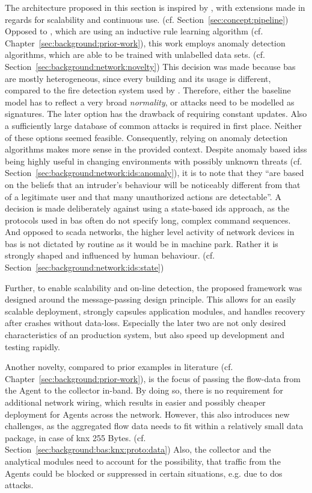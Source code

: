 The architecture proposed in this section is inspired by \textcite{Pan2014}, with extensions made in regards for scalability and continuous use. (cf. Section~\ref{sec:concept:pipeline})
Opposed to \textcite{Pan2014}, which are using an inductive rule learning algorithm (cf. Chapter~\ref{sec:background:prior-work}), this work employs anomaly detection algorithms, which are able to be trained with unlabelled data sets. (cf. Section~\ref{sec:background:network:novelty})
This decision was made because \gls{bas} are mostly heterogeneous, since every building and its usage is different, compared to the fire detection system used by \textcite{Pan2014}.
Therefore, either the baseline model has to reflect a very broad \emph{normality}, or attacks need to be modelled as signatures. The later option has the drawback of requiring constant updates. Also a sufficiently large database of common attacks is required in first place.
Neither of these options seemed feasible.
Consequently, relying on anomaly detection algorithms makes more sense in the provided context.
Despite anomaly based \glspl{ids} being highly useful in changing environments with possibly unknown threats (cf. Section~\ref{sec:background:network:ids:anomaly}), it is to note that they \enquote{are based on the beliefs that an intruder's behaviour will be noticeably different from that of a legitimate user and that many unauthorized actions are detectable}. \parencite{Mukherjee1994,Yang2006}
A decision is made deliberately against using a state-based \gls{ids} approach, as the protocols used in \gls{bas} often do not specify long, complex command sequences. And opposed to \gls{scada} networks, the higher level activity of network devices in \gls{bas} is not dictated by routine as it would be in machine park. Rather it is strongly shaped and influenced by human behaviour. (cf. Section~\ref{sec:background:network:ids:state})

Further, to enable scalability and on-line detection, the proposed framework was designed around the message-passing design principle.
This allows for an easily scalable deployment, strongly capsules application modules, and handles recovery after crashes without data-loss.
Especially the later two are not only desired characteristics of an production system, but also speed up development and testing rapidly.

Another novelty, compared to prior examples in literature (cf. Chapter~\ref{sec:background:prior-work}), is the focus of passing the flow-data from the Agent to the collector in-band. By doing so, there is no requirement for additional network wiring, which results in easier and possibly cheaper deployment for Agents across the network.
However, this also introduces new challenges, as the aggregated flow data needs to fit within a relatively small data package, in case of \gls{knx} 255 Bytes. (cf. Section~\ref{sec:background:bas:knx:proto:data})
Also, the collector and the analytical modules need to account for the possibility, that traffic from the Agents could be blocked or suppressed in certain situations, e.g. due to \gls{dos} attacks.

